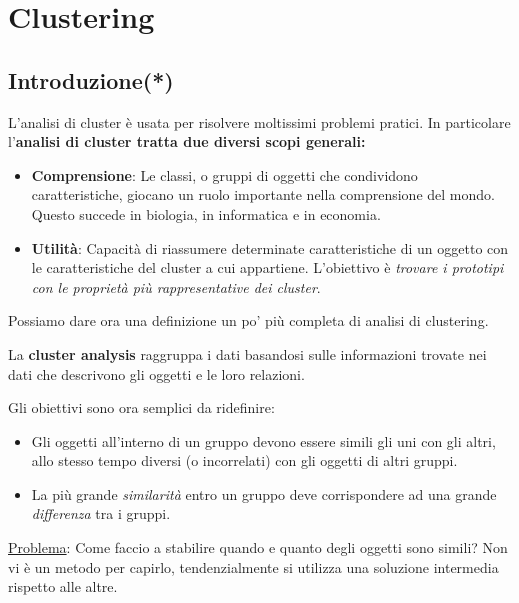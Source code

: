 \pagestyle{fancy}
\cfoot{\thepage}
\renewcommand{\footrulewidth}{0.25pt}


 
\section{Clustering}
\subsection{Introduzione(*)}

L'analisi di cluster è usata per risolvere moltissimi problemi pratici. In particolare l'\textbf{analisi di cluster tratta due diversi scopi generali:}

\begin{itemize}
	\item \textbf{Comprensione}: Le classi, o gruppi di oggetti che condividono caratteristiche, giocano un ruolo importante nella comprensione del mondo. Questo succede in biologia, in informatica e in economia.
	\item \textbf{Utilità}: Capacità di riassumere determinate caratteristiche di un oggetto con le caratteristiche del cluster a cui appartiene. L'obiettivo è \textit{trovare i prototipi con le proprietà più rappresentative dei cluster}.
\end{itemize}

Possiamo dare ora una definizione un po' più completa di analisi di clustering.
\begin{defn}
	La \textbf{cluster analysis} raggruppa i dati basandosi sulle informazioni trovate nei dati che descrivono gli oggetti e le loro relazioni.
\end{defn}

Gli obiettivi sono ora semplici da ridefinire:
\begin{itemize}
	\item Gli oggetti all'interno di un gruppo devono essere simili gli uni con gli altri, allo stesso tempo diversi (o incorrelati) con gli oggetti di altri gruppi.
	\item La più grande \textit{similarità} entro un gruppo deve corrispondere ad una grande \textit{differenza} tra i gruppi. 
\end{itemize}

\underline{Problema}: Come faccio a stabilire quando  e quanto degli oggetti sono simili? Non vi è un metodo per capirlo, tendenzialmente si utilizza una soluzione intermedia rispetto alle altre. 

